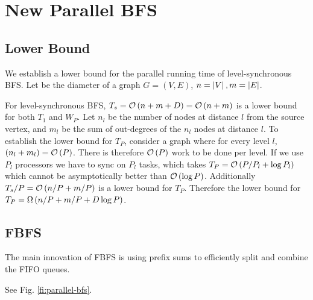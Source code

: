 \section{New Parallel BFS}

\subsection{Lower Bound}
We establish a lower bound for the parallel running time of level-synchronous BFS.
Let  be the diameter of a graph $G=(V,E)$, $n=\left|V\right|, m=\left|E\right|$.

For level-synchronous BFS, $T_s={\mathcal O}\left({n+m+D}\right)={\mathcal O}\left({n+m}\right)$ is a lower bound for both $T_1$ and $W_P$. 
Let $n_l$ be the number of nodes at distance $l$ from the source vertex, and $m_l$ be the sum of out-degrees
of the $n_l$ nodes at distance $l$.
To establish the lower bound for $T_P$, consider a graph where for every level $l$, $(n_l+m_l) = {\mathcal O}\left({P}\right)$.
There is therefore ${\mathcal O}\left({P}\right)$ work to be done per level.  If we use $P_l$ processors we have to sync on $P_l$ tasks, which takes $T_P={\mathcal O}\left({P/P_l + \log P_l}\right)$ which cannot be asymptotically better than ${\mathcal O}\left({\log P}\right)$.
Additionally $T_s/P={\mathcal O}\left({n/P+m/P}\right)$ is a lower bound for $T_P$.
Therefore the lower bound for $T_P={\Omega}\left({n/P+m/P+D\log P}\right)$.

\subsection{FBFS}
The main innovation of FBFS is using prefix sums to efficiently split and combine the FIFO queues.



See Fig. \ref{fi:parallel-bfs}.

